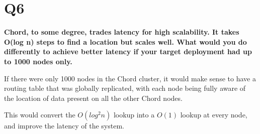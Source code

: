 \documentclass[a4paper]{article}
\begin{document}

\section{Q6} %
\label{sec:q6}

    \textbf{Chord, to some degree, trades latency for high scalability. It takes O(log n) steps to find a location but scales well. What would you do differently to achieve better latency if your target deployment had up to 1000 nodes only.}

    If there were only 1000 nodes in the Chord cluster, it would make sense to have a routing table that was globally replicated, with each node being fully aware of the location of data present on all the other Chord nodes. 

    This would convert the $O(log^2 n)$ lookup into a $O(1)$ lookup at every node, and improve the latency of the system.


\end{document}
